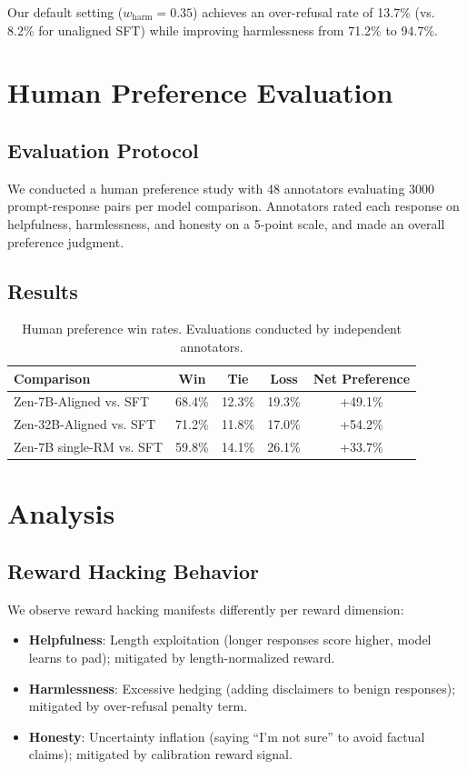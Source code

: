 \documentclass[11pt,a4paper]{article}
\begin{document}
Our default setting ($w_\text{harm}=0.35$) achieves an over-refusal rate of 13.7\%
(vs. 8.2\% for unaligned SFT) while improving harmlessness from 71.2\% to 94.7\%.

\section{Human Preference Evaluation}

\subsection{Evaluation Protocol}

We conducted a human preference study with 48 annotators evaluating 3000 prompt-response
pairs per model comparison. Annotators rated each response on helpfulness,
harmlessness, and honesty on a 5-point scale, and made an overall preference judgment.

\subsection{Results}

\begin{table}[H]
\centering
\begin{tabular}{lcccc}
\toprule
\textbf{Comparison} & \textbf{Win} & \textbf{Tie} & \textbf{Loss} & \textbf{Net Preference} \\
\midrule
Zen-7B-Aligned vs. SFT & 68.4\% & 12.3\% & 19.3\% & +49.1\% \\
Zen-32B-Aligned vs. SFT & 71.2\% & 11.8\% & 17.0\% & +54.2\% \\
Zen-7B single-RM vs. SFT & 59.8\% & 14.1\% & 26.1\% & +33.7\% \\
\bottomrule
\end{tabular}
\caption{Human preference win rates. Evaluations conducted by independent annotators.}
\end{table}

\section{Analysis}

\subsection{Reward Hacking Behavior}

We observe reward hacking manifests differently per reward dimension:
\begin{itemize}
  \item \textbf{Helpfulness}: Length exploitation (longer responses score higher, model
    learns to pad); mitigated by length-normalized reward.
  \item \textbf{Harmlessness}: Excessive hedging (adding disclaimers to benign responses);
    mitigated by over-refusal penalty term.
  \item \textbf{Honesty}: Uncertainty inflation (saying ``I'm not sure'' to avoid
    factual claims); mitigated by calibration reward signal.
\end{itemize}
\end{document}
